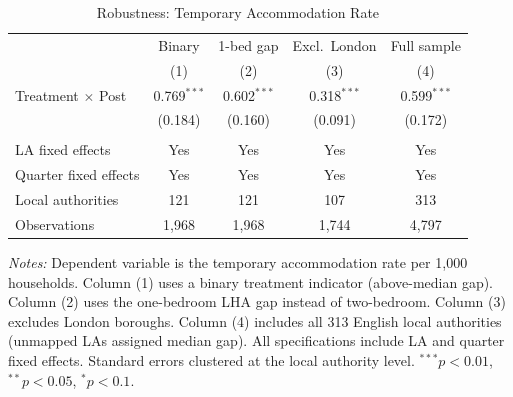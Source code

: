 \begin{table}[t]
\centering
\caption{Robustness: Temporary Accommodation Rate}
\label{tab:robust}
\begin{tabular}{lcccc}
\hline\hline
 & \multicolumn{1}{c}{Binary} & \multicolumn{1}{c}{1-bed gap} & \multicolumn{1}{c}{Excl.\ London} & \multicolumn{1}{c}{Full sample} \\
 & \multicolumn{1}{c}{(1)} & \multicolumn{1}{c}{(2)} & \multicolumn{1}{c}{(3)} & \multicolumn{1}{c}{(4)} \\
\hline
Treatment $\times$ Post & 0.769$^{***}$ & 0.602$^{***}$ & 0.318$^{***}$ & 0.599$^{***}$ \\
 & (0.184) & (0.160) & (0.091) & (0.172) \\
\\
LA fixed effects & Yes & Yes & Yes & Yes \\
Quarter fixed effects & Yes & Yes & Yes & Yes \\
Local authorities & 121 & 121 & 107 & 313 \\
Observations & 1,968 & 1,968 & 1,744 & 4,797 \\
\hline\hline
\end{tabular}
\begin{tablenotes}
\small
\item \textit{Notes:} Dependent variable is the temporary accommodation rate per 1,000 households. Column (1) uses a binary treatment indicator (above-median gap). Column (2) uses the one-bedroom LHA gap instead of two-bedroom. Column (3) excludes London boroughs. Column (4) includes all 313 English local authorities (unmapped LAs assigned median gap). All specifications include LA and quarter fixed effects. Standard errors clustered at the local authority level. $^{***}p<0.01$, $^{**}p<0.05$, $^{*}p<0.1$.
\end{tablenotes}
\end{table}
